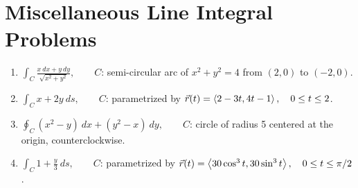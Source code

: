 \pagebreak

\section*{Miscellaneous Line Integral Problems}

\begin{enumerate}[{Problem }1.]

\item \(\int_C \frac{x\ dx + y\ dy}{\sqrt{x^2+y^2}}, \qquad C\): semi-circular arc of \(x^2+y^2 = 4\) from \((2,0)\) to \((-2,0)\).

\vfill

%

\item \(\int_C x+2y\ ds, \qquad C\): parametrized by \(\vec{r}(t) = \left\langle2-3t, 4t-1\right\rangle, \quad 0\leq t\leq 2\).

\vfill

\item \(\oint_C \left(x^2-y\right)\ dx + \left(y^2-x\right)\ dy, \qquad C\): circle of radius 5 centered at the origin, counterclockwise.

\vfill

\item \(\int_C 1+\frac{y}{3}\ ds, \qquad C\): parametrized by \(\vec{r}(t) = \left\langle30\cos^3 t, 30\sin^3 t\right\rangle, \quad 0\leq t\leq \pi/2\).

\vfill

\end{enumerate}






